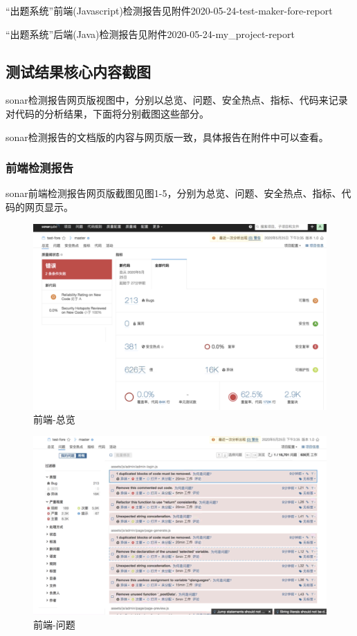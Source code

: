 \documentclass[hyperref, a4paper]{ctexart}
\begin{document}
``出题系统''前端(Javascript)检测报告见附件2020-05-24-test-maker-fore-report

``出题系统''后端(Java)检测报告见附件2020-05-24-my\_project-report

\hypertarget{ux6d4bux8bd5ux7ed3ux679cux6838ux5fc3ux5185ux5bb9ux622aux56fe}{%
\subsection{测试结果核心内容截图}\label{ux6d4bux8bd5ux7ed3ux679cux6838ux5fc3ux5185ux5bb9ux622aux56fe}}

sonar检测报告网页版视图中，分别以总览、问题、安全热点、指标、代码来记录对代码的分析结果，下面将分别截图这些部分。

sonar检测报告的文档版的内容与网页版一致，具体报告在附件中可以查看。

\hypertarget{ux524dux7aefux68c0ux6d4bux62a5ux544a}{%
\subsubsection{前端检测报告}\label{ux524dux7aefux68c0ux6d4bux62a5ux544a}}

sonar前端检测报告网页版截图见图1-5，分别为总览、问题、安全热点、指标、代码的网页显示。

\begin{figure}
\centering
\includegraphics{screenshots/lab7-pic/f-1.png}
\caption{前端-总览}
\end{figure}

\begin{figure}
\centering
\includegraphics{screenshots/lab7-pic/f-2.png}
\caption{前端-问题}
\end{figure}
\end{document}
